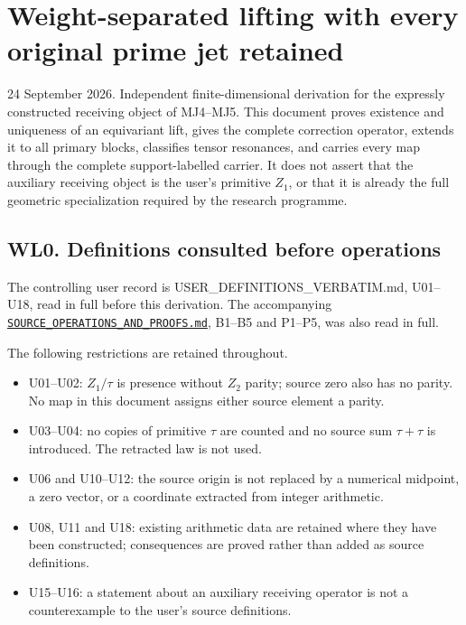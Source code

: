 \section{Weight-separated lifting with every original prime jet
retained}\label{weight-separated-lifting-with-every-original-prime-jet-retained}

24 September 2026. Independent finite-dimensional derivation for the
expressly constructed receiving object of MJ4--MJ5. This document proves
existence and uniqueness of an equivariant lift, gives the complete
correction operator, extends it to all primary blocks, classifies tensor
resonances, and carries every map through the complete support-labelled
carrier. It does not assert that the auxiliary receiving object is the
user's primitive \(Z_1\), or that it is already the full geometric
specialization required by the research programme.

\subsection{WL0. Definitions consulted before
operations}\label{wl0.-definitions-consulted-before-operations}

The controlling user record is
{USER\_DEFINITIONS\_VERBATIM.md},
U01--U18, read in full before this derivation. The accompanying
\href{../foundations/user_definitions_20260924/SOURCE_OPERATIONS_AND_PROOFS.md}{\nolinkurl{SOURCE_OPERATIONS_AND_PROOFS.md}},
B1--B5 and P1--P5, was also read in full.

The following restrictions are retained throughout.

\begin{itemize}
\tightlist
\item
  U01--U02: \(Z_1/\tau\) is presence without \(Z_2\) parity; source zero
  also has no parity. No map in this document assigns either source
  element a parity.
\item
  U03--U04: no copies of primitive \(\tau\) are counted and no source
  sum \(\tau+\tau\) is introduced. The retracted law is not used.
\item
  U06 and U10--U12: the source origin is not replaced by a numerical
  midpoint, a zero vector, or a coordinate extracted from integer
  arithmetic.
\item
  U08, U11 and U18: existing arithmetic data are retained where they
  have been constructed; consequences are proved rather than added as
  source definitions.
\item
  U15--U16: a statement about an auxiliary receiving operator is not a
  counterexample to the user's source definitions.
\end{itemize}

